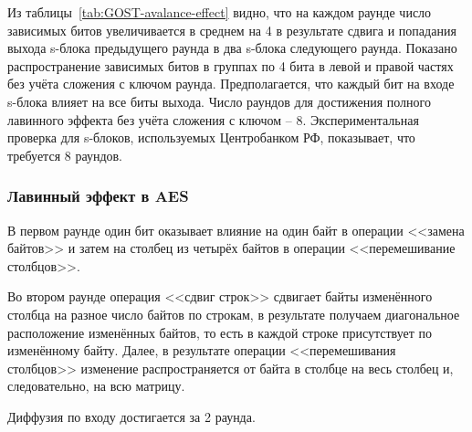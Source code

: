 Из таблицы~\ref{tab:GOST-avalance-effect} видно, что на каждом раунде число зависимых битов увеличивается в среднем на 4 в результате сдвига и попадания выхода s-блока предыдущего раунда в два s-блока следующего раунда. Показано распространение зависимых битов в группах по 4 бита в левой и правой частях без учёта сложения с ключом раунда. Предполагается, что каждый бит на входе s-блока влияет на все биты выхода. Число раундов для достижения полного лавинного эффекта без учёта сложения с ключом -- 8. Экспериментальная проверка для s-блоков, используемых Центробанком РФ, показывает, что требуется 8 раундов.


\subsubsection{Лавинный эффект в AES}

В первом раунде один бит оказывает влияние на один байт в операции <<замена байтов>> и затем на столбец из четырёх байтов в операции <<перемешивание столбцов>>.

Во втором раунде операция <<сдвиг строк>> сдвигает байты изменённого столбца на разное число байтов по строкам, в результате получаем диагональное расположение изменённых байтов, то есть в каждой строке присутствует по изменённому байту. Далее, в результате операции <<перемешивания столбцов>> изменение распространяется от байта в столбце на весь столбец и, следовательно, на всю матрицу.

Диффузия по входу достигается за 2 раунда.
